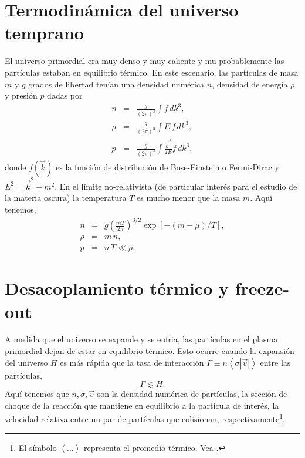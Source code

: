 \section*{Termodinámica del universo temprano}

El universo primordial era muy denso y muy caliente y mu probablemente las partículas estaban en equilibrio térmico. En este escenario, las partículas de masa $m$ y $g$ grados de libertad tenían una densidad numérica $n$, densidad de energía $\rho$ y presión $p$ dadas por
\begin{eqnarray}
n &=& \frac{g}{(2\pi)^3} \int f\, dk^3, \nonumber \\
\rho &=& \frac{g}{(2\pi)^3} \int E \,f\, dk^3, \nonumber \\
p &=& \frac{g}{(2\pi)^3} \int \frac{\vec{k}^2}{2E} f\, dk^3,
\end{eqnarray}
donde $f(\vec{k})$ es la función de distribución de Bose-Einstein o Fermi-Dirac y $E^2 = \vec{k}^2 + m^2$. En el límite no-relativista (de particular interés para el estudio de la materia oscura) la temperatura $T$ es mucho menor que la masa $m$. Aquí tenemos,
\begin{eqnarray}
n &=& g\left( \frac{mT}{2\pi} \right)^{3/2} \exp [-(m-\mu)/T], \nonumber \\
\rho &=& m\, n, \nonumber \\
p &=& n\, T \ll \rho. 
\end{eqnarray}



\section*{Desacoplamiento térmico y freeze-out}

A medida que el universo se expande y se enfria, las partículas en el plasma primordial dejan de estar en equilibrio térmico. Esto ocurre cuando la expansión del universo $H$ es más rápida que la tasa de interacción $\Gamma \equiv n \left< \sigma |\vec{v}|\right>$ entre las partículas,
\begin{equation}
\Gamma \lesssim H.
\end{equation}
Aquí tenemos que $n,\sigma,\vec{v}$ son la densidad numérica de partículas, la sección de choque de la reacción que mantiene en equilibrio a la partícula de interés, la velocidad relativa entre un par de partículas que colisionan, respectivamente\footnote{El símbolo $\left< ... \right>$ representa el promedio térmico. Vea \cite{gondolo1991cosmic}.}.

